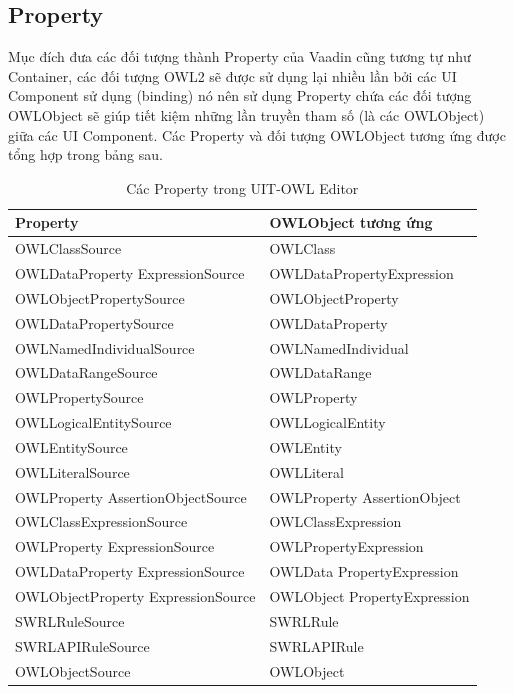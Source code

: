 \subsection{Property}
Mục đích đưa các đối tượng thành Property của Vaadin cũng tương tự như Container, các đối tượng OWL2 sẽ được sử dụng lại nhiều lần bởi các UI Component sử dụng (binding) nó nên sử dụng Property chứa các đối tượng OWLObject sẽ giúp tiết kiệm những lần truyền tham số (là các OWLObject) giữa các UI Component. Các Property và đối tượng OWLObject tương ứng được tổng hợp trong bảng sau.
\begin{table}[h!]
	\centering
	\begin{tabular}{|l|l|}
		\hline
		Property & OWLObject tương ứng  \\
		\hline
		OWLClassSource	& OWLClass \\ 
		\hline
		OWLDataProperty ExpressionSource & OWLDataPropertyExpression  \\
		\hline
		OWLObjectPropertySource & OWLObjectProperty  \\		
		\hline
		OWLDataPropertySource	& OWLDataProperty   \\
		\hline
		OWLNamedIndividualSource& OWLNamedIndividual   \\
		\hline
		OWLDataRangeSource	& OWLDataRange   \\
		\hline
		OWLPropertySource 	& OWLProperty   \\
		\hline
		OWLLogicalEntitySource & OWLLogicalEntity \\
		\hline
		OWLEntitySource	& OWLEntity	 \\
		\hline
		OWLLiteralSource	& OWLLiteral \\
		\hline
		OWLProperty AssertionObjectSource & OWLProperty AssertionObject \\
		\hline
		OWLClassExpressionSource	& OWLClassExpression \\		
		\hline
		OWLProperty ExpressionSource	& OWLPropertyExpression  \\		
		\hline
		OWLDataProperty ExpressionSource	& OWLData PropertyExpression \\		
		\hline
		OWLObjectProperty ExpressionSource	& OWLObject PropertyExpression \\	
		SWRLRuleSource	& SWRLRule	 \\
		\hline
		SWRLAPIRuleSource	& SWRLAPIRule \\
		\hline
		OWLObjectSource & OWLObject \\
		\hline
	\end{tabular}
	\caption{Các Property trong UIT-OWL Editor\label{overflow}}
\end{table}
